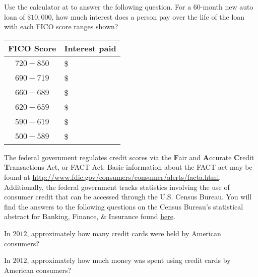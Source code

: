 \documentclass{ximera}
\begin{document}
\begin{question}
Use the calculator at  to answer the following question. For a 60-month new auto loan of $\$10,000$, how much interest does a person pay over the life of the loan with each FICO score ranges shown?

\begin{freeResponse}
\begin{tabular}{@{}cl@{}}\toprule
 \textbf{FICO Score} & \textbf{Interest paid}\\\midrule
$720-850$ & \$\\
$690-719$ & \$\\
$660-689$ & \$\\
$620-659$ & \$\\
$590-619$ & \$\\
$500-589$ & \$\\
\bottomrule
\end{tabular}
\end{freeResponse}
\end{question}

The federal government regulates credit scores via the \textbf{F}air and \textbf{A}ccurate \textbf{C}redit \textbf{T}ransactions Act, or FACT Act. Basic information about the FACT act may be found at \href{http://www.fdic.gov/consumers/consumer/alerts/facta.html}{http://www.fdic.gov/consumers/consumer/alerts/facta.html}. Additionally, the federal government tracks statistics involving the use of consumer credit that can be accessed through the U.S. Census Bureau. You will find the answers to the following questions on the Census Bureau's statistical abstract for Banking, Finance, \& Insurance found \href{http://www.census.gov/compendia/statab/cats/banking_finance_insurance/payment_systems_consumer_credit_mortgage_debt.html}{here}.


\begin{question}
In $2012$, approximately how many credit cards were held by American consumers?
    \begin{multipleChoice}
    \end{multipleChoice}
\end{question}

\begin{question}
In $2012$, approximately how much money was spent using credit cards by American consumers?
    \begin{multipleChoice}
    \end{multipleChoice}
\end{question}
\end{document}
